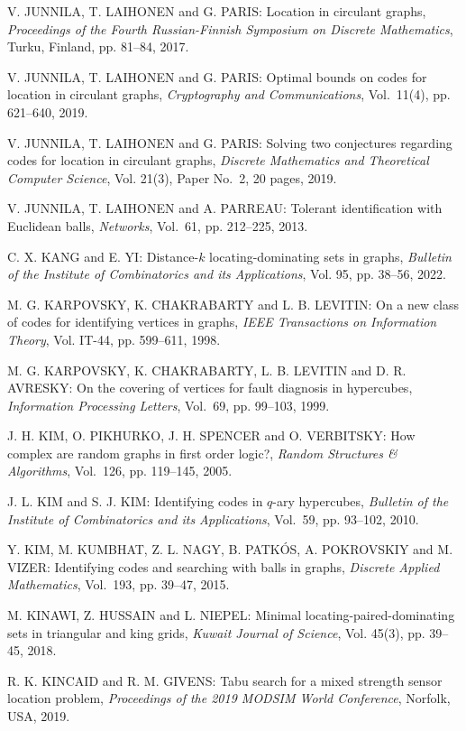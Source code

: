 \begin{thebibliography}{999}
V. JUNNILA, T. LAIHONEN and G. PARIS: Location in circulant graphs, {\it Proceedings of the Fourth Russian-Finnish Symposium on Discrete Mathematics}, Turku, Finland, pp. 81--84, 2017.

V. JUNNILA, T. LAIHONEN and G. PARIS: Optimal bounds on codes for location in circulant graphs, {\it Cryptography and Communications}, Vol.~11(4), pp. 621--640, 2019.

V. JUNNILA, T. LAIHONEN and G. PARIS: Solving two conjectures regarding codes for location in circulant graphs, {\it Discrete Mathematics and Theoretical Computer Science}, Vol. 21(3), Paper No.~2, 20 pages, 2019.

V. JUNNILA, T. LAIHONEN and A. PARREAU: Tolerant identification with Euclidean balls, {\it Networks}, Vol.~61, pp. 212--225, 2013.

C. X. KANG and E. YI: Distance-$k$ locating-dominating sets in graphs, {\it Bulletin of the Institute of Combinatorics and its Applications}, Vol. 95, pp. 38--56, 2022.

M. G. KARPOVSKY, K. CHAKRABARTY and L. B. LEVITIN: On a new class of codes for identifying vertices in graphs, {\it IEEE Transactions on Information Theory}, Vol. IT-44, pp. 599--611, 1998.

M. G. KARPOVSKY, K. CHAKRABARTY, L. B. LEVITIN and D. R. AVRESKY: On the covering of vertices for fault diagnosis in hypercubes, {\it Information Processing Letters}, Vol.~69, pp. 99--103, 1999.

J. H. KIM, O. PIKHURKO, J. H. SPENCER and O. VERBITSKY: How complex are random graphs in first order logic?, {\it Random Structures \& Algorithms}, Vol.~126, pp. 119--145, 2005.

J. L. KIM and S. J. KIM: Identifying codes in $q$-ary hypercubes, {\it Bulletin of the Institute of Combinatorics and its Applications}, Vol.~59, pp. 93--102, 2010.

Y. KIM, M. KUMBHAT, Z. L. NAGY, B. PATK\'OS, A. POKROVSKIY and M. VIZER: Identifying codes and searching with balls in graphs, {\it Discrete Applied Mathematics}, Vol.~193, pp. 39--47, 2015.

M. KINAWI, Z. HUSSAIN and L. NIEPEL: Minimal locating-paired-dominating sets in triangular and king grids, {\it Kuwait Journal of Science}, Vol. 45(3), pp. 39--45, 2018.

R. K. KINCAID and R. M. GIVENS: Tabu search for a mixed strength sensor location problem, {\it Proceedings of the 2019 MODSIM World Conference}, Norfolk, USA, 2019.


\end{thebibliography}

